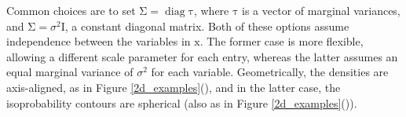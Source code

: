 \documentclass{article}
\newcommand{\mat}[1]{\bm{\mathrm{#1}}}
\renewcommand{\vec}[1]{\bm{\mathrm{#1}}}
\DeclareMathOperator{\diag}{diag}
\begin{document}
Common choices are to set $\mat{\Sigma} = \diag \vec{\tau}$, where
$\vec{\tau}$ is a vector of marginal variances, and $\mat{\Sigma} =
\sigma^2 \mat{I}$, a constant diagonal matrix.  Both of these options
assume independence between the variables in $\vec{x}$.  The former
case is more flexible, allowing a different scale parameter for each
entry, whereas the latter assumes an equal marginal variance of
$\sigma^2$ for each variable.  Geometrically, the densities are
axis-aligned, as in Figure \ref{2d_examples}(),
and in the latter case, the isoprobability contours are spherical
(also as in Figure \ref{2d_examples}()).
\end{document}
